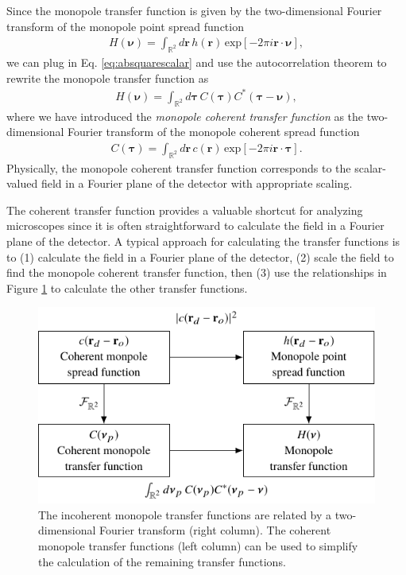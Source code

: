 \documentclass[]{osa-article}
\providecommand{\mb}[1]{\mathbf{#1}}
\providecommand{\mbb}[1]{\mathbb{#1}}
\providecommand{\bs}[1]{\boldsymbol{#1}}
\providecommand{\bv}{\bs{\nu}}
\providecommand{\taup}{\bs{\tau}}
\begin{document}
Since the monopole transfer function is given by the two-dimensional Fourier
transform of the monopole point spread function
\begin{align}
  H(\bv) = \int_{\mbb{R}^2}d\mb{r}\,h(\mb{r})\,\text{exp}[-2\pi i\mb{r}\cdot\bv],
\end{align}
we can plug in Eq. \ref{eq:absquarescalar} and use the autocorrelation theorem to
rewrite the monopole transfer function as
\begin{align}
  H(\bv) = \int_{\mbb{R}^2}d\taup\, C(\taup)C^*(\taup - \bv), 
\end{align}
where we have introduced the
\textit{monopole coherent transfer function} as the two-dimensional Fourier
transform of the monopole coherent spread function
\begin{align}
  C(\taup) = \int_{\mbb{R}^2}d\mb{r}\, c(\mb{r})\,\text{exp}[-2\pi i\mb{r}\cdot\taup].
\end{align}
Physically, the monopole coherent transfer function corresponds to the
scalar-valued field in a Fourier plane of the detector with appropriate scaling.

The coherent transfer function provides a valuable shortcut for analyzing
microscopes since it is often straightforward to calculate the field in a
Fourier plane of the detector. A typical approach for calculating the transfer
functions is to (1) calculate the field in a Fourier plane of the detector, (2)
scale the field to find the monopole coherent transfer function, then (3) use
the relationships in Figure \ref{fig:monopole-transfer-functions} to calculate
the other transfer functions.

\begin{figure}
  \centering
  \includegraphics[scale=1.0]{../figures/monopole-transfer-functions/monopole-transfer-functions.pdf}
  \caption{The incoherent monopole transfer functions are related by a
    two-dimensional Fourier transform (right column). The coherent monopole
    transfer functions (left column) can be used to simplify the calculation of
    the remaining transfer functions.}
   \label{fig:monopole-transfer-functions}
 \end{figure}
\end{document}
